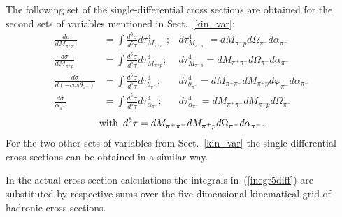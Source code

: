 The following set of the single-differential cross sections are obtained for the second sets of variables mentioned in Sect.~\ref{kin_var}:
\begin{equation}
\begin{aligned}
\frac{d\sigma}{dM_{\pi^{+}\pi^{-}}} & =
\int\frac{d^{5}\sigma}{d^{5}\tau}d\tau_{M_{\pi^{+}\pi^{-}}}^{4}; & 
 d\tau_{M_{\pi^{+}\pi^{-}}}^{4} =
dM_{\pi^{+}p}d\Omega_{\pi^{-}}d\alpha_{\pi^{-}} \\
\frac{d\sigma}{dM_{\pi^{+}p}} & =
\int\frac{d^{5}\sigma}{d^{5}\tau}d\tau_{M_{\pi^{+}p}}^{4}; & 
d\tau_{M_{\pi^{+}p}}^{4} =
dM_{\pi^{+}\pi^{-}}d\Omega_{\pi^{-}}d\alpha_{\pi^{-}} \\
\frac{d\sigma}{d(-cos\theta_{\pi^{-}})} & =
\int\frac{d^{5}\sigma}{d^{5}\tau}d\tau_{\theta_{\pi^{-}}}^{4}; & 
d\tau_{\theta_{\pi^{-}}}^{4} =
dM_{\pi^{+}\pi^{-}}dM_{\pi^{+}p}d\varphi_{\pi^{-}}d\alpha_{\pi^{-}} \\
\frac{d\sigma}{\alpha_{\pi^{-}}} & =
\int\frac{d^{5}\sigma}{d^{5}\tau}d\tau_{\alpha_{\pi^{-}}}^{4}; & 
d\tau_{\alpha_{\pi^{-}}}^{4} =
dM_{\pi^{+}\pi^{-}}dM_{\pi^{+}p}d\Omega_{\pi^{-}}
\end{aligned}
\label{inegr5diff}
\end{equation}
$$
\text{with\,\,\,} d^{5}\tau = dM_{\pi^{+}\pi^{-}}dM_{\pi^{+}p}d\Omega_{\pi^{-}}d\alpha_{\pi^{-}}. 
$$
For the two other sets of variables from Sect.~\ref{kin_var} the single-differential cross sections can be obtained in a similar way.


In the actual cross section calculations the
integrals in~(\ref{inegr5diff}) are
substituted by respective sums over the
five-dimensional kinematical grid of hadronic
cross sections. 


